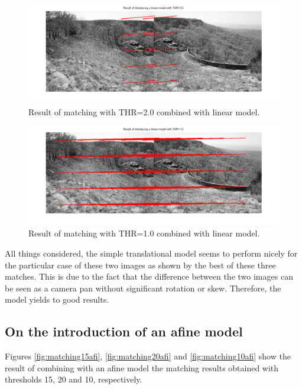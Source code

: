 \begin{figure}[htb]
	\centering
		\includegraphics[width=\textwidth]{./img/ex1/matching_linear_model_20.png}
	\caption{Result of matching with THR=2.0 combined with linear model.}
	\label{fig:matching20lin}
\end{figure}

\begin{figure}[htb]
	\centering
		\includegraphics[width=\textwidth]{./img/ex1/matching_linear_model_10.png}
	\caption{Result of matching with THR=1.0 combined with linear model.}
	\label{fig:matching10lin}
\end{figure}

All things considered, the simple translational model seems to perform nicely for
the particular case of these two images as shown by the best of these three matches.
This is due to the fact that the difference between the two images can be seen
as a camera pan without significant rotation or skew. Therefore, the model
yields to good results.

\subsection{On the introduction of an afine model}

Figures \ref{fig:matching15afi}, \ref{fig:matching20afi} and \ref{fig:matching10afi}
show the result of combining with an afine model the matching results
obtained with thresholds 15, 20 and 10, respectively.

